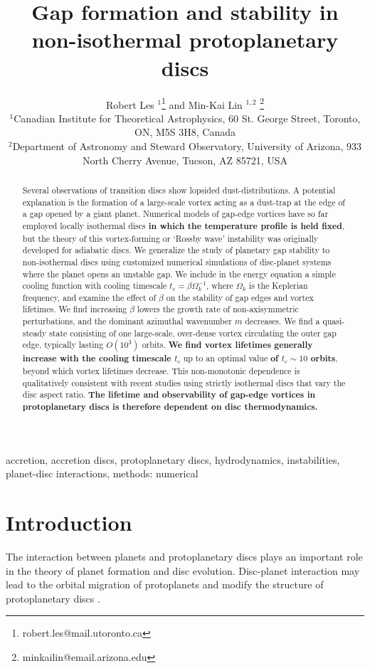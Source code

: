\documentclass[useAMS,usenatbib]{mn2e}
\title[Gaps in non-isothermal discs]{Gap formation and stability in 
  non-isothermal protoplanetary discs}
\author[Les and Lin]{Robert Les
  $^1$\thanks{robert.les@mail.utoronto.ca} and Min-Kai Lin $^{1,2}$
  \thanks{ minkailin@email.arizona.edu} \\ 
  $^1$Canadian Institute for Theoretical Astrophysics,  
  60 St. George Street, Toronto, ON, M5S 3H8, Canada \\
  $^2$Department of Astronomy and Steward Observatory, University of
  Arizona, 933 North Cherry Avenue, Tucson, AZ 85721, USA 
}
\begin{document}
\maketitle
\begin{abstract}
  Several observations of transition discs show lopsided
  dust-distributions. A potential explanation is the formation of a
  large-scale vortex acting as a dust-trap at the edge of a gap opened
  by a giant planet. Numerical models of gap-edge vortices have
  so far employed locally isothermal discs {\bf in which the temperature profile is held fixed}, but the 
  theory of this vortex-forming or `Rossby wave' instability was
  originally developed for adiabatic discs.  
  We generalize the study of planetary gap stability to non-isothermal
  discs using customized numerical simulations of disc-planet
  systems where the planet opens an unstable gap. 
  We include in the energy equation a simple cooling function with
  cooling timescale $t_c=\beta\Omega_k^{-1}$, where $\Omega_k$ is
  the Keplerian frequency, and examine the effect of $\beta$ on the
  stability of gap edges and vortex lifetimes. We find increasing
  $\beta$ lowers the growth rate of non-axisymmetric perturbations, and the
  dominant azimuthal wavenumber $m$ decreases.  
  We find a quasi-steady state consisting of one  
  large-scale, over-dense vortex circulating the outer gap edge, typically  
  lasting $O(10^3)$ orbits. {\bf
    We find vortex lifetimes generally increase with the cooling
    timescale $t_c$} up to an optimal value {\bf of $t_c\sim 10$
    orbits}, beyond which vortex lifetimes decrease. This 
  non-monotonic dependence is qualitatively consistent with 
  recent studies using strictly isothermal discs that vary the disc
  aspect ratio.  {\bf The lifetime and observability of gap-edge 
    vortices in protoplanetary discs is therefore dependent on disc
    thermodynamics. }
\end{abstract}

\begin{keywords}
  accretion, accretion discs, protoplanetary discs, hydrodynamics, instabilities,
  planet-disc interactions, methods: numerical 
\end{keywords}


\section{Introduction}\label{intro}
The interaction between planets and protoplanetary discs plays an
important role in the theory of planet formation and disc 
evolution. Disc-planet interaction may lead to the orbital migration
of protoplanets and modify the structure of
protoplanetary discs  \citep[see][for a recent review]{baruteau13}.  
\end{document}
